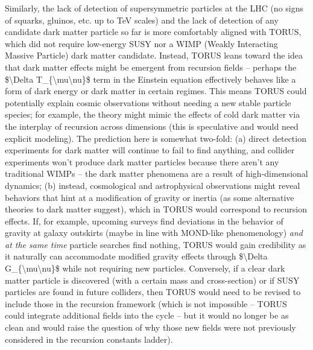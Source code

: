 \documentclass[]{article}
\begin{document}
Similarly, the lack of detection of supersymmetric particles at the LHC
(no signs of squarks, gluinos, etc. up to TeV scales) and the lack of
detection of any candidate dark matter particle so far is more
comfortably aligned with TORUS, which did not require low-energy SUSY
nor a WIMP (Weakly Interacting Massive Particle) dark matter candidate.
Instead, TORUS leans toward the idea that dark matter effects might be
emergent from recursion fields -- perhaps the \$\textbackslash{}Delta
T\_\{\textbackslash{}mu\textbackslash{}nu\}\$ term in the Einstein
equation effectively behaves like a form of dark energy or dark matter
in certain regimes. This means TORUS could potentially explain cosmic
observations without needing a new stable particle species; for example,
the theory might mimic the effects of cold dark matter via the interplay
of recursion across dimensions (this is speculative and would need
explicit modeling). The prediction here is somewhat two-fold: (a) direct
detection experiments for dark matter will continue to fail to find
anything, and collider experiments won't produce dark matter particles
because there aren't any traditional WIMPs -- the dark matter phenomena
are a result of high-dimensional dynamics; (b) instead, cosmological and
astrophysical observations might reveal behaviors that hint at a
modification of gravity or inertia (as some alternative theories to dark
matter suggest), which in TORUS would correspond to recursion effects.
If, for example, upcoming surveys find deviations in the behavior of
gravity at galaxy outskirts (maybe in line with MOND-like phenomenology)
\emph{and at the same time} particle searches find nothing, TORUS would
gain credibility as it naturally can accommodate modified gravity
effects through \$\textbackslash{}Delta
G\_\{\textbackslash{}mu\textbackslash{}nu\}\$ while not requiring new
particles. Conversely, if a clear dark matter particle is discovered
(with a certain mass and cross-section) or if SUSY particles are found
in future colliders, then TORUS would need to be revised to include
those in the recursion framework (which is not impossible -- TORUS could
integrate additional fields into the cycle -- but it would no longer be
as clean and would raise the question of why those new fields were not
previously considered in the recursion constants ladder).
\end{document}
